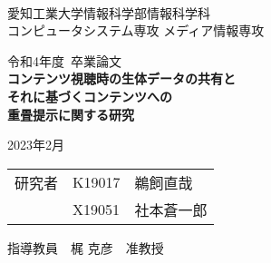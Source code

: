 \begin{titlepage}

\ \\
\begin{center}

{\LARGE 愛知工業大学情報科学部情報科学科\\
コンピュータシステム専攻 メディア情報専攻

\vspace{1.0cm}

令和4年度~卒業論文\\

\vspace{2.0cm}
{\Huge 
\baselineskip=15mm
\textbf{コンテンツ視聴時の生体データの共有と\\それに基づくコンテンツへの\\重畳提示に関する研究\\}}

\vspace{7.0cm}

2023年2月\\

\vspace{1.0cm}

\begin{tabular}[h]{lll}
  研究者  & K19017 & 鵜飼直哉\\
         & X19051 & 社本蒼一郎\\
\end{tabular}

\vspace{1.0cm}

指導教員\ \ 梶 克彦\ \ 准教授}

\end{center}

\end{titlepage}
    